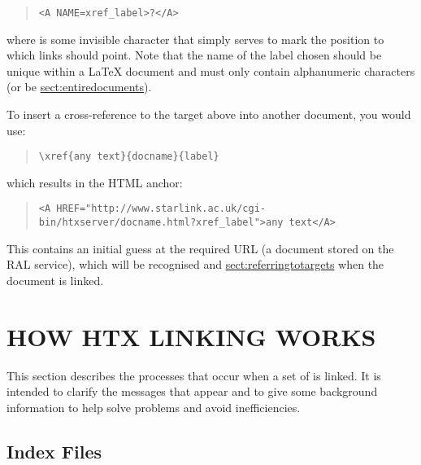\begin{quote}
\begin{verbatim}
<A NAME=xref_label>?</A>
\end{verbatim}
\end{quote}

where  is some invisible character that simply serves to mark
the position to which links should point. Note that the name of the
label chosen should be unique within a \mbox{\LaTeX} document and must
only contain alphanumeric characters (or be \hyperref{blank}{blank --
see \S}{}{sect:entiredocuments}).

To insert a cross-reference to the target above into another document,
you would use:

\begin{quote}
\begin{verbatim}
\xref{any text}{docname}{label}
\end{verbatim}
\end{quote}

which results in the HTML anchor:

\begin{quote}
\begin{verbatim}
<A HREF="http://www.starlink.ac.uk/cgi-bin/htxserver/docname.html?xref_label">any text</A>
\end{verbatim}
\end{quote}

This contains an initial guess at the required URL (a document stored on the
RAL service), which will be recognised and 
\hyperref{modified as necessary}{modified as necessary (see \S}{)}{sect:referringtotargets} when the
document is linked.

\section{\label{sect:howlinkingworks}HOW HTX LINKING WORKS}

This section describes the processes that occur when a set of
 is linked. It is intended to clarify the
messages that appear and to give some background information to help
solve problems and avoid inefficiencies.

\subsection{\label{sect:indexfiles}Index Files}

